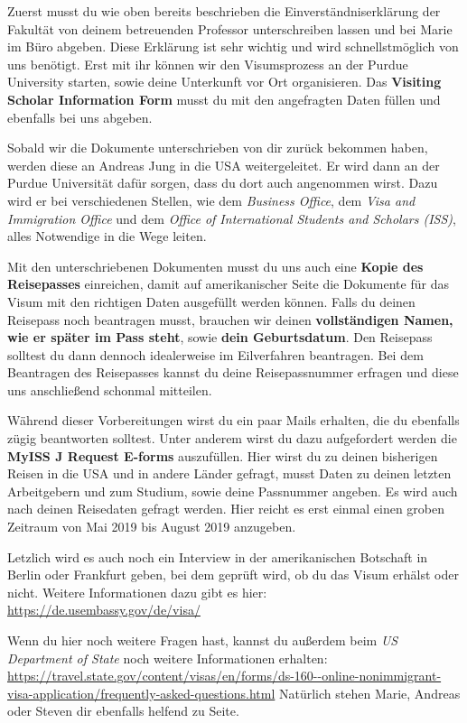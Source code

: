 \documentclass[
  paper=a4,
  fontsize=12pt,
  DIV=16,
  headheight=52pt,
  footheight=45pt,
  headinclude,
  parskip=full,
]{scrartcl}
\begin{document}
Zuerst musst du wie oben bereits beschrieben die Einverständniserklärung der Fakultät von deinem betreuenden Professor unterschreiben lassen und bei Marie im Büro
abgeben.
Diese Erklärung ist sehr wichtig und wird schnellstmöglich von uns benötigt.
Erst mit ihr können wir den Visumsprozess an der Purdue University starten, sowie deine Unterkunft vor Ort organisieren.
Das \textbf{Visiting Scholar Information Form} musst du mit den angefragten Daten füllen und ebenfalls bei uns abgeben.

Sobald wir die Dokumente unterschrieben von dir zurück bekommen haben, werden diese an Andreas Jung in die USA weitergeleitet.
Er wird dann an der Purdue Universität dafür sorgen, dass du dort auch angenommen wirst.
Dazu wird er bei verschiedenen Stellen, wie dem \textit{Business Office}, dem \textit{Visa and Immigration Office} und dem \textit{Office of International Students and Scholars (ISS)}, alles Notwendige in die Wege leiten.

Mit den unterschriebenen Dokumenten musst du uns auch eine \textbf{Kopie des Reisepasses} einreichen, damit auf amerikanischer Seite die Dokumente für das Visum mit den richtigen Daten ausgefüllt werden können.
Falls du deinen Reisepass noch beantragen musst, brauchen wir deinen \textbf{vollständigen Namen, wie er später im Pass steht}, sowie \textbf{dein Geburtsdatum}.
Den Reisepass solltest du dann dennoch idealerweise im Eilverfahren beantragen.
Bei dem Beantragen des Reisepasses kannst du deine Reisepassnummer erfragen und diese
uns anschließend schonmal mitteilen.

Während dieser Vorbereitungen wirst du ein paar Mails erhalten, die du
ebenfalls zügig beantworten solltest.
Unter anderem wirst du dazu aufgefordert werden die \textbf{MyISS J Request E-forms} auszufüllen.
Hier wirst du zu deinen bisherigen Reisen in die USA und in andere Länder gefragt, musst Daten zu deinen letzten Arbeitgebern und zum Studium, sowie deine Passnummer angeben.
Es wird auch nach deinen Reisedaten gefragt werden.
Hier reicht es erst einmal einen groben Zeitraum von Mai 2019 bis August 2019 anzugeben.

Letzlich wird es auch noch ein Interview in der amerikanischen Botschaft in Berlin oder Frankfurt geben, bei dem geprüft wird, ob du das Visum erhälst oder nicht.
Weitere Informationen dazu gibt es hier: \url{https://de.usembassy.gov/de/visa/}

Wenn du hier noch weitere Fragen hast, kannst du außerdem beim \textit{US Department of State} noch weitere Informationen erhalten: \url{https://travel.state.gov/content/visas/en/forms/ds-160--online-nonimmigrant-visa-application/frequently-asked-questions.html}
Natürlich stehen Marie, Andreas oder Steven dir ebenfalls helfend zu Seite.
\end{document}
